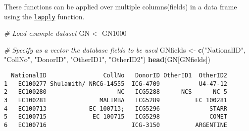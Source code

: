 \documentclass[
]{article}
\newenvironment{Shaded}{\begin{snugshade}}{\end{snugshade}}
\newcommand{\CommentTok}[1]{\textcolor[rgb]{0.56,0.35,0.01}{\textit{#1}}}
\newcommand{\KeywordTok}[1]{\textcolor[rgb]{0.13,0.29,0.53}{\textbf{#1}}}
\newcommand{\NormalTok}[1]{#1}
\newcommand{\StringTok}[1]{\textcolor[rgb]{0.31,0.60,0.02}{#1}}
\begin{document}
These functions can be applied over multiple columns(fields) in a data
frame using the
\href{http://google.com/\#q=\%5BR\%5D+lapply}{\texttt{lapply}} function.

\begin{Shaded}
\begin{Highlighting}[]
\CommentTok{# Load example dataset}
\NormalTok{GN <-}\StringTok{ }\NormalTok{GN1000}

\CommentTok{# Specify as a vector the database fields to be used}
\NormalTok{GNfields <-}\StringTok{ }\KeywordTok{c}\NormalTok{(}\StringTok{"NationalID"}\NormalTok{, }\StringTok{"CollNo"}\NormalTok{, }\StringTok{"DonorID"}\NormalTok{, }\StringTok{"OtherID1"}\NormalTok{, }\StringTok{"OtherID2"}\NormalTok{)}
\KeywordTok{head}\NormalTok{(GN[GNfields])}
\end{Highlighting}
\end{Shaded}

\begin{verbatim}
  NationalID                CollNo   DonorID OtherID1  OtherID2
1   EC100277 Shulamith/ NRCG-14555  ICG-4709           U4-47-12
2   EC100280                    NC   ICG5288      NCS      NC 5
3   EC100281               MALIMBA   ICG5289          EC 100281
4   EC100713            EC 100713;   ICG5296              STARR
5   EC100715             EC 100715   ICG5298              COMET
6   EC100716                        ICG-3150          ARGENTINE
\end{verbatim}
\end{document}
